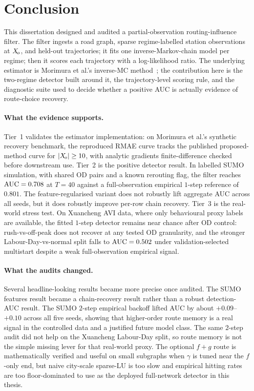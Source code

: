 \section{Conclusion}\label{sec:conclusion}

This dissertation designed and audited a
partial-observation routing-influence filter. The filter ingests a
road graph, sparse regime-labelled station observations at $X_{\!o}$, and
held-out trajectories; it fits one inverse-Markov-chain model per regime;
then it scores each trajectory with a log-likelihood ratio. The underlying
estimator is Morimura et al.'s inverse-MC method~\cite{morimura2013}; the
contribution here is the two-regime detector built around it, the
trajectory-level scoring rule, and the diagnostic suite used to decide
whether a positive AUC is actually evidence of route-choice recovery.

\paragraph{What the evidence supports.}
Tier~1 validates the estimator implementation: on Morimura et al.'s
synthetic recovery benchmark, the reproduced RMAE curve tracks the
published proposed-method curve for $|X_{\!o}|\ge10$, with analytic gradients
finite-difference checked before downstream use. Tier~2 is the positive
detector result. In labelled SUMO simulation, with shared OD pairs and a
known rerouting flag, the filter reaches $\mathrm{AUC}=0.708$ at $T=40$ against a
full-observation empirical $1$-step reference of $0.801$. The
feature-regularised variant does not robustly lift aggregate AUC across
all seeds, but it does robustly improve per-row chain recovery. Tier~3 is the real-world stress test. On Xuancheng AVI
data, where only behavioural proxy labels are available, the fitted
$1$-step detector remains near chance after OD control: rush-vs-off-peak
does not recover at any tested OD granularity, and the stronger
Labour-Day-vs-normal split falls to $\mathrm{AUC}=0.502$ under
validation-selected multistart despite a weak full-observation empirical
signal.

\paragraph{What the audits changed.}
Several headline-looking results became more precise once audited. The
SUMO features result became a chain-recovery result rather than a robust
detection-AUC result. The SUMO $2$-step empirical backoff lifted AUC by
about $+0.09$--$+0.10$ across all five seeds, showing that higher-order
route memory is a real signal in the controlled data and a justified
future model class. The same $2$-step audit did not help on the Xuancheng
Labour-Day split, so route memory is not the simple missing lever for that
real-world proxy. The optional $f+g$ route is mathematically verified and
useful on small subgraphs when $\gamma$ is tuned near the $f$-only end, but
naive city-scale sparse-LU is too slow and empirical hitting rates are too
floor-dominated to use as the deployed full-network detector in this
thesis.

